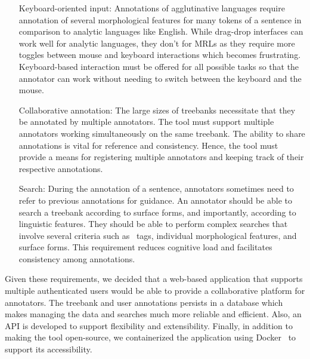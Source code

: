 \begin{itemize}[before=\normalfont, font=\itshape, align=left,noitemsep,topsep=0pt,parsep=3pt,partopsep=0pt,labelsep=3pt,align=left]
    \item[Keyboard-oriented input:]
        Annotations of agglutinative languages require annotation of several morphological features for many tokens of a sentence in comparison to analytic languages like English.
        While drag-drop interfaces can work well for analytic languages, they don't for MRLs as they require more toggles between mouse and keyboard interactions which becomes frustrating.
        Keyboard-based interaction must be offered for all possible tasks so that the annotator can work without needing to switch between the keyboard and the mouse.
    \item[Collaborative annotation:]
        The large sizes of treebanks necessitate that they be annotated by multiple annotators.
        The tool must support multiple annotators working simultaneously on the same treebank.
        The ability to share annotations is vital for reference and consistency.
        Hence, the tool must provide a means for registering multiple annotators and keeping track of their respective annotations.
    \item[Search:]
        During the annotation of a sentence, annotators sometimes need to refer to previous annotations for guidance.
        An annotator should be able to search a treebank according to surface forms, and importantly, according to linguistic features.
        They should be able to perform complex searches that involve several criteria such as \ud\ tags, individual morphological features, and surface forms.
        This requirement reduces cognitive load and facilitates consistency among annotations.
\end{itemize}

Given these requirements, we decided that a web-based application that supports multiple authenticated users would be able to provide a collaborative platform for annotators.
The treebank and user annotations persists in a database which makes managing the data and searches much more reliable and efficient.
Also, an API is developed to support flexibility and extensibility.
Finally, in addition to making the tool open-source, we containerized the application using Docker~\cite{docker} to support its accessibility.
